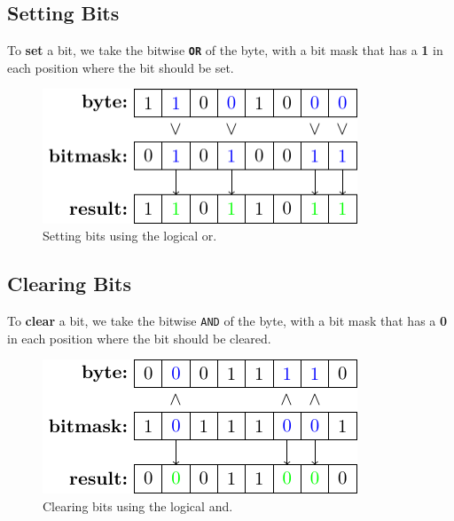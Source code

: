 \documentclass[a4paper]{report}
\newcommand{\keywordinline}[1]{\textcolor[rgb]{0.00,0.50,0.00}{\textbf{\texttt{#1}}}}
\begin{document}
\subsection{Setting Bits}
To \textbf{set} a bit, we take the bitwise \keywordinline{OR} of the byte, with a bit mask
that has a \textbf{1} in each position where the bit should be set.
\begin{figure}[H]
    \centering
    \includegraphics[height = 4cm, keepaspectratio = true]{figures/bit_set.pdf}
    \caption{Setting bits using the logical or.} %
\end{figure}
\subsection{Clearing Bits}
To \textbf{clear} a bit, we take the bitwise \texttt{AND} of the byte, with a bit mask
that has a \textbf{0} in each position where the bit should be cleared.
\begin{figure}[H]
    \centering
    \includegraphics[height = 4cm, keepaspectratio = true]{figures/bit_clear.pdf}
    \caption{Clearing bits using the logical and.} %
\end{figure}
\end{document}
